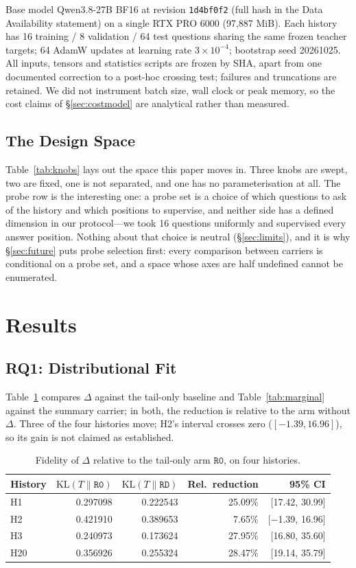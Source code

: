 \documentclass[sigconf,nonacm]{acmart}
\newcommand{\KL}{\mathrm{KL}}
\newcommand{\armR}{\texttt{R0}}
\newcommand{\armRD}{\texttt{RD}}
\begin{document}
Base model Qwen3.8-27B BF16 at revision \texttt{1d4bf0f2} (full hash in the Data Availability statement) on a
single RTX PRO 6000 (97,887 MiB). Each history has
16 training / 8 validation / 64 test questions sharing the same frozen teacher targets; 64 AdamW updates
at learning rate $3\times10^{-4}$; bootstrap seed 20261025. All inputs, tensors and statistics scripts are
frozen by SHA, apart from one documented correction to a post-hoc crossing test; failures and truncations are
retained. We did not instrument batch size, wall clock or peak
memory, so the cost claims of \S\ref{sec:costmodel} are analytical rather than measured.

\subsection{The Design Space}\label{sec:space}

Table~\ref{tab:knobs} lays out the space this paper moves in. Three knobs are swept, two are fixed, one is not
separated, and one has no parameterisation at all. The probe row is the interesting one: a probe set is a choice
of which questions to ask of the history and which positions to supervise, and neither side has a defined
dimension in our protocol---we took 16 questions uniformly and supervised every answer position. Nothing about
that choice is neutral (\S\ref{sec:limits}), and it is why \S\ref{sec:future} puts probe selection first: every
comparison between carriers is conditional on a probe set, and a space whose axes are half undefined cannot be
enumerated.

\section{Results}\label{sec:results}

\subsection{RQ1: Distributional Fit}\label{sec:fit}

Table~\ref{tab:fit} compares $\Delta$ against the tail-only baseline and Table~\ref{tab:marginal} against the
summary carrier; in both, the reduction is relative to the arm without $\Delta$. Three of the four histories
move; H2's interval crosses zero ($[-1.39,16.96]$), so its gain is not claimed as established.
\begin{table}[b]
\centering
\small
\begin{tabular}{lrrrr}
\toprule
History & $\KL(T\|\armR)$ & $\KL(T\|\armRD)$ & Rel.\ reduction & 95\% CI \\
\midrule
H1 & 0.297098 & 0.222543 & 25.09\% & [17.42, 30.99] \\
H2 & 0.421910 & 0.389653 & 7.65\% & [$-$1.39, 16.96] \\
H3 & 0.240973 & 0.173624 & 27.95\% & [16.80, 35.60] \\
H20 & 0.356926 & 0.255324 & 28.47\% & [19.14, 35.79] \\
\bottomrule
\end{tabular}
\caption{Fidelity of $\Delta$ relative to the tail-only arm $\armR{}$, on four histories.}
\label{tab:fit}
\end{table}
\end{document}
